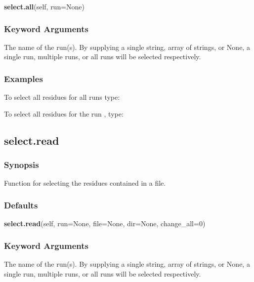  \textsf{\textbf{select.all}(self, run=None)} 

  
 \subsubsection{Keyword Arguments} 

   The name of the run(s).  By supplying a single string, array of strings, or None, a single run, multiple runs, or all runs will be selected respectively.  

  

  
 \subsubsection{Examples} 

 To select all residues for all runs type: 
  


 To select all residues for the run , type: 
  



  

 \newpage 

 \subsection{select.read} 

  
 \subsubsection{Synopsis} 

 Function for selecting the residues contained in a file. 
  

  
 \subsubsection{Defaults} 

 \textsf{\textbf{select.read}(self, run=None, file=None, dir=None, change\_all=0)} 

  
 \subsubsection{Keyword Arguments} 

   The name of the run(s).  By supplying a single string, array of strings, or None, a single run, multiple runs, or all runs will be selected respectively.   

